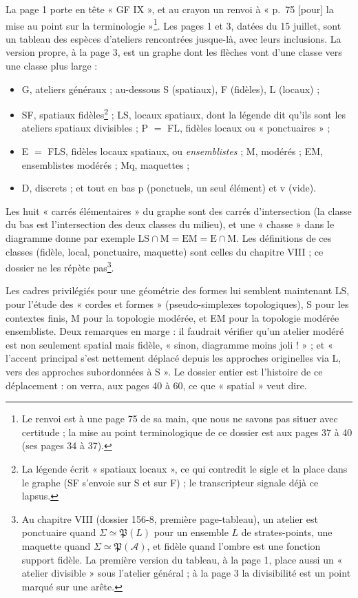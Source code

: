 \documentclass[11pt,a4paper]{article}
\begin{document}
La page 1 porte en tête « GF IX », et au crayon un renvoi à « p.~75 [pour] la
mise au point sur la terminologie »\footnote{Le renvoi est à une page 75 de sa
main, que nous ne savons pas situer avec certitude ; la mise au point
terminologique de ce dossier est aux pages 37 à 40 (ses pages 34 à 37).}. Les
pages 1 et 3, datées du 15 juillet, sont un tableau des espèces d'ateliers
rencontrées jusque-là, avec leurs inclusions. La version propre, à la page 3,
est un graphe dont les flèches vont d'une classe vers une classe plus large :
\begin{itemize}
\item G, ateliers généraux ; au-dessous S (spatiaux), F (fidèles), L (locaux) ;
\item SF, spatiaux fidèles\footnote{La légende écrit « spatiaux locaux », ce qui
contredit le sigle et la place dans le graphe (SF s'envoie sur S et sur F) ; le
transcripteur signale déjà ce lapsus.} ; LS, locaux spatiaux, dont la légende
dit qu'ils sont les ateliers spatiaux divisibles ; P $=$ FL, fidèles locaux ou
« ponctuaires » ;
\item E $=$ FLS, fidèles locaux spatiaux, ou \emph{ensemblistes} ; M, modérés ;
EM, ensemblistes modérés ; Mq, maquettes ;
\item D, discrets ; et tout en bas p (ponctuels, un seul élément) et v (vide).
\end{itemize}
Les huit « carrés élémentaires » du graphe sont des carrés d'intersection (la
classe du bas est l'intersection des deux classes du milieu), et une « chasse »
dans le diagramme donne par exemple $\mathrm{LS} \cap \mathrm{M} = \mathrm{EM} =
\mathrm{E} \cap \mathrm{M}$. Les définitions de ces classes (fidèle, local,
ponctuaire, maquette) sont celles du chapitre VIII ; ce dossier ne les répète
pas\footnote{Au chapitre VIII (dossier 156-8, première page-tableau), un atelier
est ponctuaire quand $\Sigma \simeq \mathfrak{P}(L)$ pour un ensemble $L$ de
strates-points, une maquette quand $\Sigma \simeq \mathfrak{P}(\mathcal{A})$, et
fidèle quand l'ombre est une fonction support fidèle. La première version du
tableau, à la page 1, place aussi un « atelier divisible » sous l'atelier
général ; à la page 3 la divisibilité est un point marqué sur une arête.}.

Les cadres privilégiés pour une géométrie des formes lui semblent maintenant LS,
pour l'étude des « cordes et formes » (pseudo-simplexes topologiques), S pour
les contextes finis, M pour la topologie modérée, et EM pour la topologie
modérée ensembliste. Deux remarques en marge : il faudrait vérifier qu'un
atelier modéré est non seulement spatial mais fidèle, « sinon, diagramme moins
joli ! » ; et « l'accent principal s'est nettement déplacé depuis les approches
originelles via L, vers des approches subordonnées à S ». Le dossier entier est
l'histoire de ce déplacement : on verra, aux pages 40 à 60, ce que « spatial »
veut dire.
\end{document}
